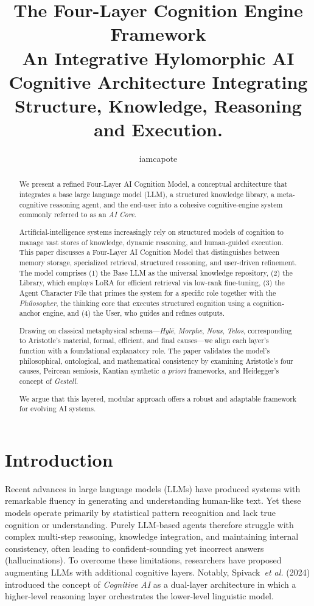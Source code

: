\documentclass{article}
\title{\textbf{The Four-Layer Cognition Engine Framework}\\ 
An Integrative Hylomorphic AI Cognitive Architecture Integrating Structure, Knowledge, Reasoning and Execution.}
\author{iamcapote}
\affil{Bit Index Tabula}
\date{}
\begin{document}
\maketitle

\begin{abstract}
We present a refined Four-Layer AI Cognition Model, a conceptual architecture that integrates a base large language model (LLM), a structured knowledge library, a meta-cognitive reasoning agent, and the end-user into a cohesive cognitive-engine system commonly referred to as an \emph{AI Core}.

Artificial-intelligence systems increasingly rely on structured models of cognition to manage vast stores of knowledge, dynamic reasoning, and human-guided execution. This paper discusses a Four-Layer AI Cognition Model that distinguishes between memory storage, specialized retrieval, structured reasoning, and user-driven refinement. The model comprises (1) the Base LLM as the universal knowledge repository, (2) the Library, which employs LoRA for efficient retrieval via low-rank fine-tuning, (3) the Agent Character File that primes the system for a specific role together with the \textit{Philosopher}, the thinking core that executes structured cognition using a cognition-anchor engine, and (4) the User, who guides and refines outputs.

Drawing on classical metaphysical schema—\emph{Hylē}, \emph{Morphe}, \emph{Nous}, \emph{Telos}, corresponding to Aristotle’s material, formal, efficient, and final causes—we align each layer’s function with a foundational explanatory role. The paper validates the model’s philosophical, ontological, and mathematical consistency by examining Aristotle’s four causes, Peircean semiosis, Kantian synthetic \emph{a priori} frameworks, and Heidegger’s concept of \emph{Gestell}.

We argue that this layered, modular approach offers a robust and adaptable framework for evolving AI systems.
\end{abstract}

\section{Introduction}
Recent advances in large language models (LLMs) have produced systems with remarkable fluency in generating and understanding human-like text. Yet these models operate primarily by statistical pattern recognition and lack true cognition or understanding. Purely LLM-based agents therefore struggle with complex multi-step reasoning, knowledge integration, and maintaining internal consistency, often leading to confident-sounding yet incorrect answers (hallucinations). To overcome these limitations, researchers have proposed augmenting LLMs with additional cognitive layers. Notably, Spivack~\emph{et al.} (2024) introduced the concept of \emph{Cognitive AI} as a dual-layer architecture in which a higher-level reasoning layer orchestrates the lower-level linguistic model.
\end{document}
